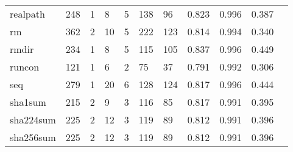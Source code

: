 \begin{longtable}{lp{1.10cm}p{1.10cm}p{1.10cm}p{1.10cm}p{1.10cm}p{1.10cm}p{1.10cm}p{1.10cm}p{1.10cm}p{1.10cm}}
realpath  &                    248 &                                  1 &                                 8 &                                5 &                               138 &                              96 &                             0.823 &                                 0.996 &                               0.387 \\
rm        &                    362 &                                  2 &                                10 &                                5 &                               222 &                             123 &                             0.814 &                                 0.994 &                               0.340 \\
rmdir     &                    234 &                                  1 &                                 8 &                                5 &                               115 &                             105 &                             0.837 &                                 0.996 &                               0.449 \\
runcon    &                    121 &                                  1 &                                 6 &                                2 &                                75 &                              37 &                             0.791 &                                 0.992 &                               0.306 \\
seq       &                    279 &                                  1 &                                20 &                                6 &                               128 &                             124 &                             0.817 &                                 0.996 &                               0.444 \\
sha1sum   &                    215 &                                  2 &                                 9 &                                3 &                               116 &                              85 &                             0.817 &                                 0.991 &                               0.395 \\
sha224sum &                    225 &                                  2 &                                12 &                                3 &                               119 &                              89 &                             0.812 &                                 0.991 &                               0.396 \\
sha256sum &                    225 &                                  2 &                                12 &                                3 &                               119 &                              89 &                             0.812 &                                 0.991 &                               0.396 \\

\end{longtable}
